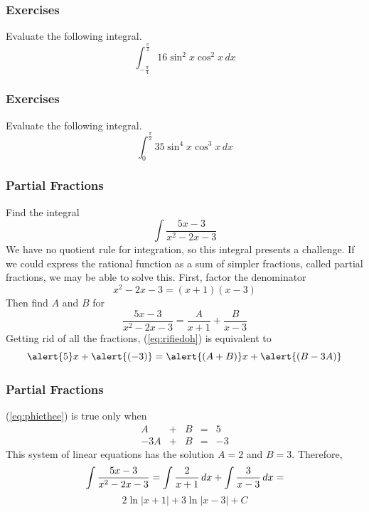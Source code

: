 \documentclass[xcolor=dvipsnames]{beamer}
\begin{document}
\begin{frame}
  \frametitle{Exercises}
  {\ubung} Evaluate the following integral.
  \begin{equation}
    \label{eq:thaemooc}
    \int_{-\frac{\pi}{4}}^{\frac{\pi}{4}}16\sin^{2}x\cos^{2}x\,dx
  \end{equation}
\end{frame}

\begin{frame}
  \frametitle{Exercises}
  {\ubung} Evaluate the following integral.
  \begin{equation}
    \label{eq:noojoosh}
    \int_{0}^{\frac{\pi}{2}}35\sin^{4}x\cos^{3}x\,dx
  \end{equation}
\end{frame}

\begin{frame}
  \frametitle{Partial Fractions}
  Find the integral
  \begin{equation}
    \label{eq:xaikieji}
    \int\frac{5x-3}{x^{2}-2x-3}
  \end{equation}
We have no quotient rule for integration, so this integral presents a
challenge. If we could express the rational function as a sum of simpler
fractions, called \alert{partial fractions}, we may be able to solve
this. First, factor the denominator
\begin{equation}
  \label{eq:cichacah}
  x^{2}-2x-3=(x+1)(x-3)
\end{equation}
Then find $A$ and $B$ for
\begin{equation}
  \label{eq:rifiedoh}
\frac{5x-3}{x^{2}-2x-3}=\frac{A}{x+1}+\frac{B}{x-3}
\end{equation}
Getting rid of all the fractions, (\ref{eq:rifiedoh}) is equivalent to
\begin{equation}
  \label{eq:phiethee}
\alert{5}x+\alert{(-3)}=\alert{(A+B)}x+\alert{(B-3A)}
\end{equation}
\end{frame}

\begin{frame}
  \frametitle{Partial Fractions}
  (\ref{eq:phiethee}) is true only when
  \begin{equation}
    \label{eq:oorighoe}
    \begin{array}{rcrcr}
      A&+&B&=&5 \\
      -3A&+&B&=&-3
    \end{array}
  \end{equation}
This system of linear equations has the solution $A=2$ and $B=3$.
Therefore,
\begin{equation}
  \label{eq:vaewahsh}
\int\frac{5x-3}{x^{2}-2x-3}=\int\frac{2}{x+1}\,dx+\int\frac{3}{x-3}\,dx=\notag
\end{equation}
\begin{equation}
  \label{eq:moochofe}
2\ln|x+1|+3\ln|x-3|+C
\end{equation}
\end{frame}
\end{document}
